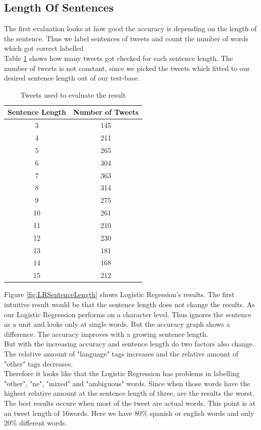 \subsection{Length Of Sentences}
The first evaluation looks at how good the accuracy is depending on the length of the sentence. Thus we label sentences of tweets and count the number of words which got correct labelled\\
Table \ref{tbl:numberOfTweets} shows how many tweets got checked for each sentence length. The number of tweets is not constant, since we picked the tweets which fitted to our desired sentence length out of our test-base.
\begin{table}[]
\centering
\label{tbl:numberOfTweets}
\begin{tabular}{c|c}
Sentence Length & Number of Tweets \\ \hline
3              & 145    \\
4              & 211    \\
5              & 265    \\
6              & 304    \\
7              & 363    \\
8              & 314    \\
9              & 275    \\
10             & 261    \\
11             & 210    \\
12             & 230    \\
13             & 181    \\
14             & 168    \\
15             & 212   
\end{tabular}
\caption{Tweets used to evaluate the result}
\end{table}
Figure \ref{fig:LRSentenceLength} shows Logistic Regession's results. The first intuitive result would be that the sentence length does not change the results. As our Logistic Regression performs on a character level. Thus ignores the sentence as a unit and looks only at single words. But the accuracy graph shows a difference. The accuracy improves with a growing sentence length.\\
But with the increasing accuracy and sentence length do two factors also change. The relative amount of "language" tags increases and the relative amount of "other" tags decreases. \\
Therefore it looks like that the Logistic Regression has problems in labelling "other", "ne", "mixed" and "ambiguous" words. Since when those words have the highest relative amount at the sentence length of three, are the results the worst. The best results occure when most of the tweet are actual words. This point is at an tweet length of 16words. Here we have 80\% spanish or english words and only 20\% different words. \\   
